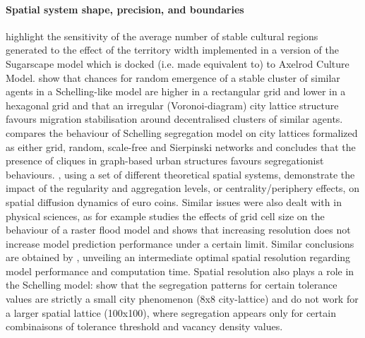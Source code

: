 \documentclass[3p,times,procedia]{elsarticle}
\begin{document}
\paragraph{Spatial system shape, precision, and boundaries} \citet{Axtelletal1996} highlight the sensitivity of the average number of stable cultural regions generated to the effect of the territory width implemented in a version of the Sugarscape model which is docked (i.e. made equivalent to) to Axelrod Culture Model. \citet{FlacheHegselmann2001} show that chances for random emergence of a stable cluster of similar agents in a Schelling-like model are higher in a rectangular grid and lower in a hexagonal grid and that an irregular (Voronoi-diagram) city lattice structure favours migration stabilisation around decentralised clusters of similar agents. \citet{Banos2012} compares the behaviour of Schelling segregation model on city lattices formalized as either grid, random, scale-free and Sierpinski networks and concludes that the presence of cliques in graph-based urban structures favours segregationist behaviours. \citet{LeTexierCaruso2017}, using a set of different theoretical spatial systems, demonstrate the impact of the regularity and aggregation levels, or centrality/periphery effects, on spatial diffusion dynamics of euro coins. Similar issues were also dealt with in physical sciences, as for example \cite{horritt2001effects} studies the effects of grid cell size on the behaviour of a raster flood model and shows that increasing resolution does not increase model prediction performance under a certain limit. Similar conclusions are obtained by \cite{vazquez2002effect}, unveiling an intermediate optimal spatial resolution regarding model performance and computation time. Spatial resolution also plays a role in the Schelling model: \citet{Singhetal2009} show that the segregation patterns for certain tolerance values are strictly a small city phenomenon (8x8 city-lattice) and do not work for a larger spatial lattice (100x100), where segregation appears only for certain combinaisons of tolerance threshold and vacancy density values.
\end{document}
